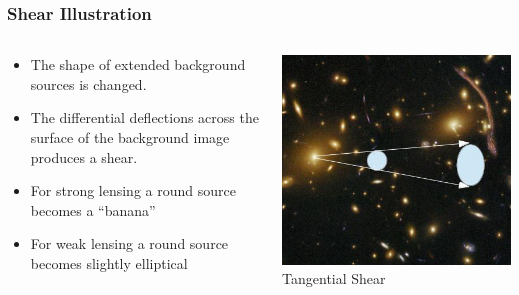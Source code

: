 \documentclass{beamer}
\begin{document}
	
\frame
{
    \frametitle{Shear Illustration}

    \begin{columns}
        \begin{column}{0.5\textwidth}    
            \begin{itemize}

                \item The shape of extended background sources is changed.

                \item The differential deflections across the surface
                    of the background image produces a shear.

                \item For strong lensing a round source becomes a ``banana''

                \item For {\color{gold} weak lensing} a round source becomes slightly elliptical

            \end{itemize}
        \end{column}
        \begin{column}{0.5\textwidth}
            \begin{center}
                \includegraphics[width=\textwidth]{shear-illustration-crop2.jpg}
                \newline
                {\small Tangential Shear}
            \end{center}
        \end{column}
    \end{columns}
}
\end{document}
